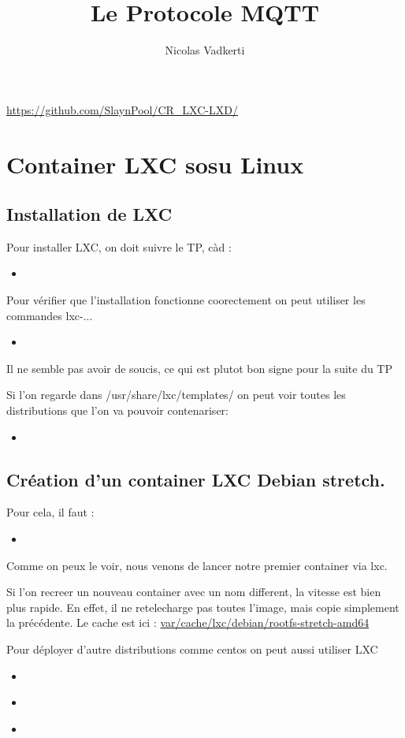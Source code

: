 \documentclass[10pt,a4paper]{article}
\title{Le Protocole MQTT}
\author{Nicolas Vadkerti}
\newcommand{\insertcode}[2]{\begin{itemize}\item[]\end{itemize}}
\begin{document}
\maketitle


\url{https://github.com/SlaynPool/CR\_LXC-LXD/}

\section {Container LXC sosu Linux}
\subsection{Installation de LXC}
Pour installer LXC, on doit suivre le TP, càd :
\insertcode{commande/1.txt}{Installation de LXC}

 Pour vérifier que l'installation fonctionne coorectement on peut utiliser les commandes lxc-...
 \insertcode{commande/2.txt}{Verification de LXC}
 Il ne semble pas avoir de soucis, ce qui est plutot bon signe pour la suite du TP 

 Si l'on regarde dans /usr/share/lxc/templates/ on peut voir toutes les distributions que l'on va pouvoir contenariser:
 \insertcode{commande/3.txt}{listes des distributions contenarisables}
 
 
 \subsection{Création d’un container LXC Debian stretch.}
 
 
 Pour cela, il faut :
 \insertcode{commande/4.txt}{premier container}
 Comme on peux le voir, nous venons de lancer notre premier container via lxc.
 
 Si l'on recreer un nouveau container avec un nom different, la vitesse est bien plus rapide. En effet, il ne retelecharge pas toutes l'image, mais copie simplement la précédente. Le cache est ici : \url{var/cache/lxc/debian/rootfs-stretch-amd64}
 
 
 Pour déployer d'autre distributions comme centos on peut aussi utiliser LXC
 \insertcode{commande/5.txt}{LXC centos}
 


\insertcode{commande/6.txt}{Les commandes utiles }

\insertcode{commande/7.txt}{Les commandes utiles}


\newpage
\end{document}
